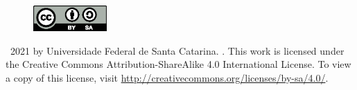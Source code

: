 \vfill

\begin{figure}[!h]
	\begin{center}
		\includegraphics[width=0.25\textwidth]{figures/by-sa.eps}
	\end{center}
\end{figure}

\textcopyright\  2021 by Universidade Federal de Santa Catarina. \thetitle. This work is licensed under the Creative Commons Attribution-ShareAlike 4.0 International License. To view a copy of this license, visit \href{http://creativecommons.org/licenses/by-sa/4.0/}{http://creativecommons.org/licenses/by-sa/4.0/}.

